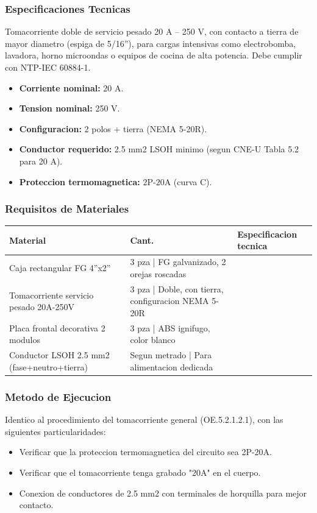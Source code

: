 \subsubsection{Especificaciones Tecnicas}

Tomacorriente doble de servicio pesado 20 A -- 250 V, con contacto a tierra de mayor diametro (espiga de 5/16''), para cargas intensivas como electrobomba, lavadora, horno microondas o equipos de cocina de alta potencia. Debe cumplir con NTP-IEC 60884-1.

\begin{itemize}[nosep]
  \item \textbf{Corriente nominal:} 20 A.
  \item \textbf{Tension nominal:} 250 V.
  \item \textbf{Configuracion:} 2 polos + tierra (NEMA 5-20R).
  \item \textbf{Conductor requerido:} 2.5 mm2 LSOH minimo (segun CNE-U Tabla 5.2 para 20 A).
  \item \textbf{Proteccion termomagnetica:} 2P-20A (curva C).
\end{itemize}

\subsubsection{Requisitos de Materiales}

\begin{longtable}{L{5.0cm} L{2.0cm} L{7.5cm}}
\toprule
\textbf{Material} & \textbf{Cant.} & \textbf{Especificacion tecnica} \\
\midrule
Caja rectangular FG 4''x2'' & 3 pza | FG galvanizado, 2 orejas roscadas \\
Tomacorriente servicio pesado 20A-250V & 3 pza | Doble, con tierra, configuracion NEMA 5-20R \\
Placa frontal decorativa 2 modulos & 3 pza | ABS ignifugo, color blanco \\
Conductor LSOH 2.5 mm2 (fase+neutro+tierra) & Segun metrado | Para alimentacion dedicada \\
\bottomrule
\end{longtable}

\subsubsection{Metodo de Ejecucion}

Identico al procedimiento del tomacorriente general (OE.5.2.1.2.1), con las siguientes particularidades:
\begin{itemize}
  \item Verificar que la proteccion termomagnetica del circuito sea 2P-20A.
  \item Verificar que el tomacorriente tenga grabado "20A" en el cuerpo.
  \item Conexion de conductores de 2.5 mm2 con terminales de horquilla para mejor contacto.
\end{itemize}


